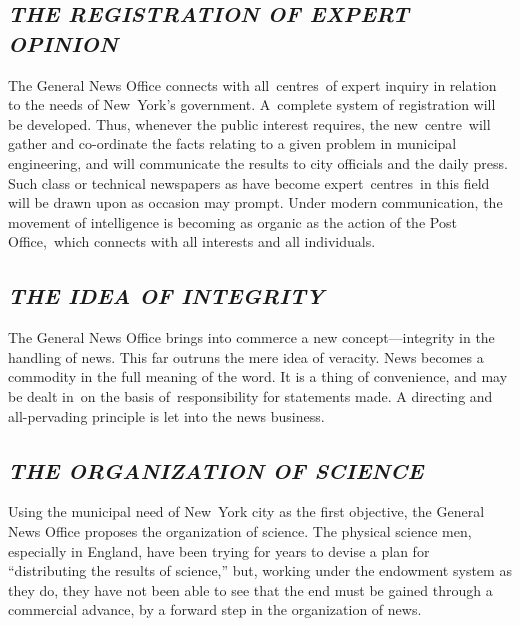 \documentclass[openany,nobib]{tufte-book}
\begin{document}
\hypertarget{the-registration-of-expert-opinion}{%
\subsection{\emph{THE REGISTRATION OF EXPERT
OPINION}}\label{the-registration-of-expert-opinion}}

The General News Office connects with all~centres~of expert inquiry in
relation to the needs of New~York's government. A~complete system of
registration will be developed. Thus, whenever the public interest
requires, the new~centre~will gather and co-ordinate the facts relating
to a given problem in municipal engineering, and will communicate the
results to city officials and the daily press. Such class or technical
newspapers as have become expert~centres~in this field will be drawn
upon as occasion may prompt. Under modern communication, the movement of
intelligence is becoming as organic as the action of the Post
Office,~which connects with all interests and all individuals.~

\enlargethispage{\baselineskip}

\hypertarget{the-idea-of-integrity}{%
\subsection{\emph{THE IDEA OF INTEGRITY}}\label{the-idea-of-integrity}}

The General News Office brings into commerce a new concept---integrity
in the handling of news. This far outruns the mere idea of veracity.
News becomes a commodity in the full meaning of the word. It is a thing
of convenience, and may be dealt in~on the basis of~responsibility for
statements made. A directing and all-pervading principle is let into the
news business.~

\hypertarget{the-organization-of-science}{%
\subsection{\emph{THE ORGANIZATION OF
SCIENCE}}\label{the-organization-of-science}}

Using the municipal need of New~York city as the first objective, the
General News Office proposes the organization of science. The physical
science men, especially in England, have been trying for years to devise
a plan for ``distributing the results of science,'' but, working under
the endowment system as they do, they have not been able to see that the
end must be gained through a commercial advance, by a forward step in
the organization of news.~
\end{document}
